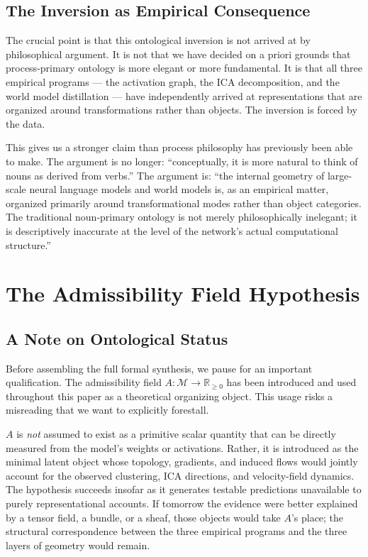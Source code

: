 \documentclass[12pt, a4paper]{article}
\theoremstyle{plain}
\theoremstyle{definition}
\theoremstyle{remark}
\newcommand{\R}{\mathbb{R}}
\newcommand{\cM}{\mathcal{M}}
\newcommand{\fA}{A}
\begin{document}
\subsection{The Inversion as Empirical Consequence}

The crucial point is that this ontological inversion is not arrived at by
philosophical argument. It is not that we have decided on a priori grounds that
process-primary ontology is more elegant or more fundamental. It is that all
three empirical programs --- the activation graph, the ICA decomposition, and
the world model distillation --- have independently arrived at representations
that are organized around transformations rather than objects. The inversion
is forced by the data.

This gives us a stronger claim than process philosophy has previously been
able to make. The argument is no longer: ``conceptually, it is more natural to
think of nouns as derived from verbs.'' The argument is: ``the internal
geometry of large-scale neural language models and world models is, as an
empirical matter, organized primarily around transformational modes rather than
object categories. The traditional noun-primary ontology is not merely
philosophically inelegant; it is descriptively inaccurate at the level of the
network's actual computational structure.''

\section{The Admissibility Field Hypothesis}

\subsection{A Note on Ontological Status}

Before assembling the full formal synthesis, we pause for an important
qualification. The admissibility field $\fA : \cM \to \R_{\geq 0}$ has been
introduced and used throughout this paper as a theoretical organizing object.
This usage risks a misreading that we want to explicitly forestall.

$\fA$ is \emph{not} assumed to exist as a primitive scalar quantity that can
be directly measured from the model's weights or activations. Rather, it is
introduced as the minimal latent object whose topology, gradients, and induced
flows would jointly account for the observed clustering, ICA directions, and
velocity-field dynamics. The hypothesis succeeds insofar as it generates
testable predictions unavailable to purely representational accounts. If
tomorrow the evidence were better explained by a tensor field, a bundle, or
a sheaf, those objects would take $\fA$'s place; the structural correspondence
between the three empirical programs and the three layers of geometry would
remain.
\end{document}
